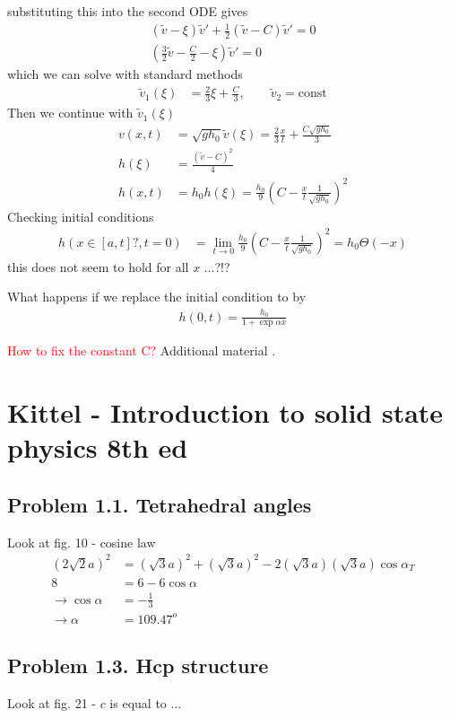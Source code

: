 \documentclass[../main.tex]{subfiles}
\begin{document}
substituting this into the second ODE gives
\begin{align}
(\tilde{v}-\xi)\tilde{v}'+\frac{1}{2}(\tilde{v}-C)\tilde{v}'=0\\
\left(\frac{3}{2}\tilde{v}-\frac{C}{2}-\xi\right)\tilde{v}'=0
\end{align}
which we can solve with standard methods
\begin{align}
\tilde{v}_1(\xi)&=\frac{2}{3}\xi+\frac{C}{3},\qquad\tilde{v}_2=\text{const}
\end{align}
Then we continue with $\tilde{v}_1(\xi)$
\begin{align}
v(x,t)&=\sqrt{gh_0}\tilde{v}(\xi)=\frac{2}{3}\frac{x}{t}+\frac{C\sqrt{gh_0}}{3}\\
h(\xi)&=\frac{(\tilde{v}-C)^2}{4}\\
h(x,t)&=h_0h(\xi)=\frac{h_0}{9}\left(C-\frac{x}{t}\frac{1}{\sqrt{gh_0}}\right)^2
\end{align}
Checking initial conditions
\begin{align}
h(x\in[a,t]?,t=0)
&=\lim_{t\rightarrow0}\frac{h_0}{9}\left(C-\frac{x}{t}\frac{1}{\sqrt{gh_0}}\right)^2=h_0\Theta(-x)
\end{align}
this does not seem to hold for all $x$ ...?!?

What happens if we replace the initial condition to by
\begin{align}
h(0,t)=\frac{h_0}{1+\exp{\alpha x}}
\end{align}


\textcolor{red}{How to fix the constant C?}
Additional material \cite{Whitham1999}.

\section{{\sc Kittel} - Introduction to solid state physics 8th ed}
\subsection{Problem 1.1. Tetrahedral angles}
Look at fig. 10 - cosine law
\begin{align}
(2\sqrt{2}a)^2&=(\sqrt{3}a)^2+(\sqrt{3}a)^2-2(\sqrt{3}a)(\sqrt{3}a)\cos\alpha_T\\
8&=6-6\cos\alpha\\
\rightarrow\cos\alpha &= -\frac{1}{3}\\
\rightarrow\alpha &= 109.47^o
\end{align}

\subsection{Problem 1.3. Hcp structure}
Look at fig. 21 - $c$ is equal to ...
\end{document}
